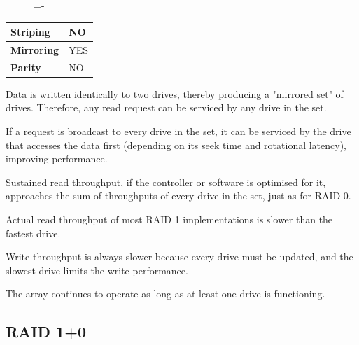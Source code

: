 \documentclass[a4paper]{systems-software}
\begin{document}
\begin{figure}[H]
  \lineskip=-\fboxrule
\end{figure}

\begin{longtabu} to \textwidth {| X[1,l] | X[6,l] |}
    \hline
    \textbf{Striping} & NO
	\\ \hline
	\textbf{Mirroring} & YES
	\\ \hline
	\textbf{Parity} & NO
	\\ \hline
\end{longtabu}

Data is written identically to two drives, thereby producing a "mirrored set" of drives. Therefore, any read request can be serviced by any drive in the set.

If a request is broadcast to every drive in the set, it can be serviced by the drive that accesses the data first (depending on its seek time and rotational latency), improving performance.

Sustained read throughput, if the controller or software is optimised for it, approaches the sum of throughputs of every drive in the set, just as for RAID 0.

Actual read throughput of most RAID 1 implementations is slower than the fastest drive.

Write throughput is always slower because every drive must be updated, and the slowest drive limits the write performance.

The array continues to operate as long as at least one drive is functioning.


\subsection*{RAID 1+0}
\end{document}
